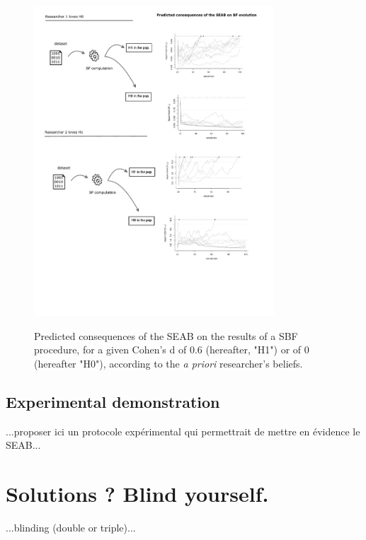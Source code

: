 \documentclass[a4paper,man,natbib,floatsintext,donotrepeattitle]{apa6}
\begin{document}
\begin{figure}[H]
  \caption{Predicted consequences of the SEAB on the results of a SBF procedure, for a given Cohen's d of 0.6 (hereafter, "H1") or of 0 (hereafter "H0"), according to the \emph{a priori} researcher's beliefs.}
  \centering
  \includegraphics[width=0.8\textwidth]{figures/BFF_predictions.pdf}
  \label{fig:pred}
\end{figure}


\subsection{Experimental demonstration}

...proposer ici un protocole expérimental qui permettrait de mettre en évidence le SEAB...

\section{Solutions ? Blind yourself.}

...blinding (double or triple)...
\end{document}
